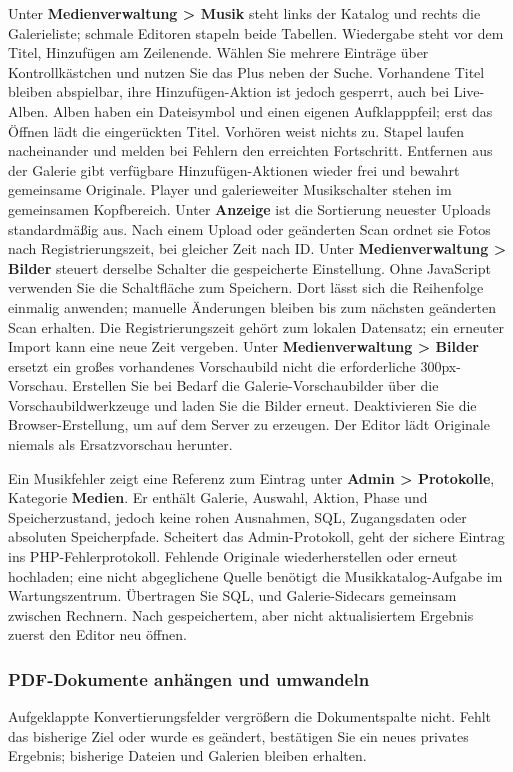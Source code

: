 \documentclass[11pt,a4paper]{article}
\newcommand{\filepath}[1]{\path{#1}}
\newcommand{\ui}[1]{\textbf{#1}}
\begin{document}
Unter \ui{Medienverwaltung > Musik} steht links der Katalog und rechts
die Galerieliste; schmale Editoren stapeln beide Tabellen. Wiedergabe steht
vor dem Titel, Hinzufügen am Zeilenende. Wählen Sie mehrere Einträge über
Kontrollkästchen und nutzen Sie das Plus neben der Suche. Vorhandene Titel
bleiben abspielbar, ihre Hinzufügen-Aktion ist jedoch gesperrt, auch bei
Live-Alben. Alben haben ein Dateisymbol und einen eigenen Aufklapppfeil;
erst das Öffnen lädt die eingerückten Titel. Vorhören weist nichts zu.
Stapel laufen nacheinander und melden bei Fehlern den erreichten Fortschritt.
Entfernen aus der Galerie gibt verfügbare Hinzufügen-Aktionen wieder frei
und bewahrt gemeinsame Originale. Player und galerieweiter Musikschalter
stehen im gemeinsamen Kopfbereich.
Unter \ui{Anzeige} ist die Sortierung neuester Uploads standardmäßig aus.
Nach einem Upload oder geänderten Scan ordnet sie Fotos nach Registrierungszeit,
bei gleicher Zeit nach ID. Unter \ui{Medienverwaltung > Bilder} steuert
derselbe Schalter die gespeicherte Einstellung. Ohne JavaScript verwenden Sie
die Schaltfläche zum Speichern. Dort lässt sich die Reihenfolge einmalig anwenden; manuelle Änderungen bleiben bis zum nächsten
geänderten Scan erhalten. Die Registrierungszeit gehört zum lokalen Datensatz;
ein erneuter Import kann eine neue Zeit vergeben.
Unter \ui{Medienverwaltung > Bilder} ersetzt ein großes vorhandenes
Vorschaubild nicht die erforderliche 300px-Vorschau. Erstellen Sie bei Bedarf
die Galerie-Vorschaubilder über die Vorschaubildwerkzeuge und laden Sie
die Bilder erneut. Deaktivieren Sie die Browser-Erstellung, um auf dem Server
zu erzeugen. Der Editor lädt Originale niemals als Ersatzvorschau herunter.

Ein Musikfehler zeigt eine Referenz zum Eintrag unter \ui{Admin > Protokolle},
Kategorie \ui{Medien}. Er enthält Galerie, Auswahl, Aktion, Phase und
Speicherzustand, jedoch keine rohen Ausnahmen, SQL, Zugangsdaten oder
absoluten Speicherpfade. Scheitert das Admin-Protokoll, geht der sichere
Eintrag ins PHP-Fehlerprotokoll. Fehlende Originale wiederherstellen oder
erneut hochladen; eine nicht abgeglichene Quelle benötigt die
Musikkatalog-Aufgabe im Wartungszentrum. Übertragen Sie SQL,
\filepath{data/music/} und Galerie-Sidecars gemeinsam zwischen Rechnern.
Nach gespeichertem, aber nicht aktualisiertem Ergebnis zuerst den Editor neu
öffnen.

\subsubsection{PDF-Dokumente anhängen und umwandeln}
Aufgeklappte Konvertierungsfelder vergrößern die Dokumentspalte nicht. Fehlt das
bisherige Ziel oder wurde es geändert, bestätigen Sie ein neues privates
Ergebnis; bisherige Dateien und Galerien bleiben erhalten.
\end{document}
